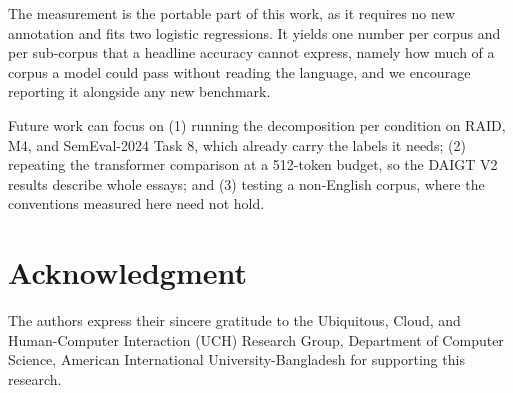 \documentclass[conference,a4paper]{IEEEtran}
\newif\ifblind
\begin{document}
The measurement is the portable part of this work, as it requires no new annotation and fits two logistic regressions. It yields one number per corpus and per sub-corpus that a headline accuracy cannot express, namely how much of a corpus a model could pass without reading the language, and we encourage reporting it alongside any new benchmark.

Future work can focus on (1) running the decomposition per condition on RAID, M4, and SemEval-2024 Task 8, which already carry the labels it needs; (2) repeating the transformer comparison at a 512-token budget, so the DAIGT V2 results describe whole essays; and (3) testing a non-English corpus, where the conventions measured here need not hold.

\ifblind\else
\section*{Acknowledgment}
The authors express their sincere gratitude to the Ubiquitous, Cloud, and Human-Computer Interaction (UCH) Research Group, Department of Computer Science, American International University-Bangladesh for supporting this research.
\fi



\end{document}
